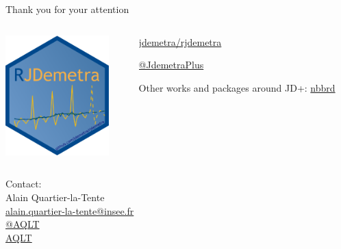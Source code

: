 \documentclass[10pt,xcolor=table,color={dvipsnames,usenames},ignorenonframetext,usepdftitle=false,french]{beamer}
\begin{document}
\begin{frame}{Thank you for your attention}
\protect\hypertarget{thank-you-for-your-attention}{}

\vspace{-0.2cm}

\begin{columns}
\begin{column}{0.4\textwidth}
\begin{center}
\includegraphics[width=4cm]{img/rjdemetra_logo.png}
\end{center}
\end{column}
\begin{column}{0.5\textwidth} 
\href{https://github.com/jdemetra/rjdemetra}{\faGithub{} jdemetra/rjdemetra}  

\href{https://twitter.com/JDemetraPlus}{\faTwitter{} @JdemetraPlus}

Other works and packages around JD+:  
\href{https://github.com/nbbrd}{\faGithub{} nbbrd}  
\end{column}
\end{columns}

\vfill

Contact:\\
Alain Quartier-la-Tente\\
\href{mailto:alain.quartier-la-tente@insee.fr}{\faEnvelope{} alain.quartier-la-tente@insee.fr}\\
\href{https://twitter.com/AQLT}{\faTwitter{} @AQLT}\\
\href{https://github.com/AQLT}{\faGithub{} AQLT}

\end{frame}
\end{document}
